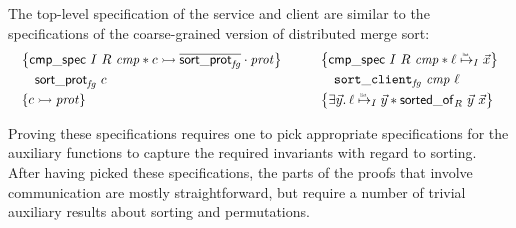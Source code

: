 The top-level specification of the service and client are similar to the
specifications of the coarse-grained version of distributed merge sort:
\[
\begin{array}{c !{\quad} c}
\begin{array}{l}
  \hoareV
    {\cmpspecname\ \interpvar\ \relvar\ \cmpvar *
     \interp \chan {\protapp {\dual\listsortelemprotname} \prot}}
    {\listsortelemprotname\ \chan}
    {\interp \chan \prot}
\end{array}
  &
\begin{array}{l}
\hoareV
  {\cmpspecname\ \interpvar\ \relvar\ \cmpvar *
   \listrefI \interpvar \loc {\vec\var}}
  {\listsortelemclientname\ \cmpvar\ \loc}
  {
  \Exists \vec\varB.
   \listrefI \interpvar \loc {\vec\varB} *
   \sortedof {\vec\varB} {\vec\var} \relvar}
\end{array}
\end{array}
\]

\noindent
Proving these specifications requires one to pick appropriate specifications for
the auxiliary functions to capture the required invariants with regard to
sorting.
After having picked these specifications, the parts of the proofs that involve
communication are mostly straightforward, but require a number of trivial
auxiliary results
about sorting and permutations.
